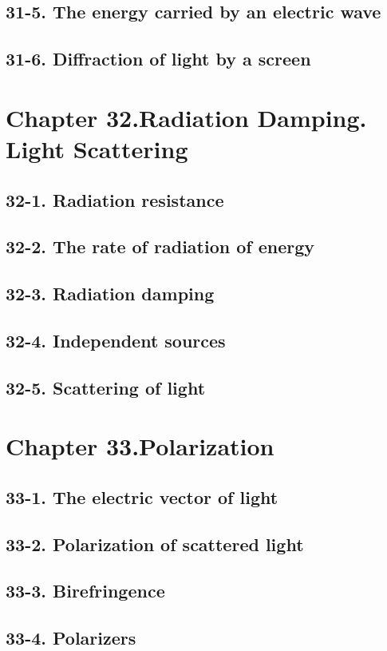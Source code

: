 \documentclass{article}
\begin{document}
\subsection{31-5. The energy carried by an electric wave}
\subsection{31-6. Diffraction of light by a screen}
\section{Chapter 32.Radiation Damping. Light Scattering}
\subsection{32-1. Radiation resistance}
\subsection{32-2. The rate of radiation of energy}
\subsection{32-3. Radiation damping}
\subsection{32-4. Independent sources}
\subsection{32-5. Scattering of light}
\section{Chapter 33.Polarization}
\subsection{33-1. The electric vector of light}
\subsection{33-2. Polarization of scattered light}
\subsection{33-3. Birefringence}
\subsection{33-4. Polarizers}
\end{document}
